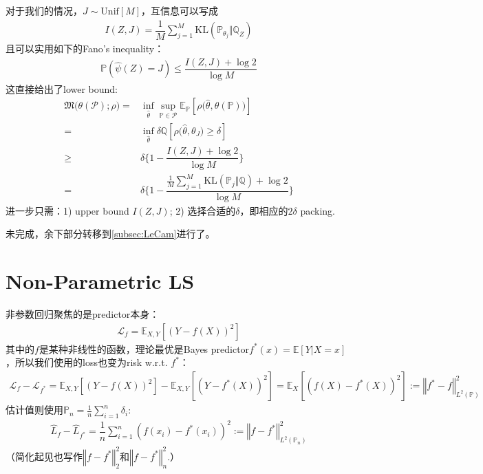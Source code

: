 \documentclass[11pt,a4paper]{ctexart}
\numberwithin{equation}{section}%
\begin{document}
对于我们的情况，$ J \sim \mathrm{ Unif }[M] $，互信息可以写成
\begin{align*}
    I(Z,J) = \dfrac{ 1 }{ M  } \sum_{j=1}^M \mathrm{ KL }\left( \mathbb{P}_{\theta _j}\Vert \mathbb{Q}_Z \right)
\end{align*}
且可以实用如下的Fano's inequality：
\begin{align*}
    \mathbb{P}\left( \hat{\psi}(Z) = J \right) \leq \dfrac{ I(Z,J)+ \log 2 }{ \log M }   
\end{align*}
这直接给出了lower bound:
\begin{align*}
    \mathfrak{M}\big(\theta (\mathcal{P});\rho \big)  = & \mathop{ \inf  }\limits_{\hat{\theta }} \mathop{ \sup  }\limits_{\mathbb{P}\in \mathcal{P}} \mathbb{E}_\mathbb{P}\left[ \rho \bigl(\hat{\theta }, \theta (\mathbb{P})\bigr) \right]   \\
    =& \mathop{ \inf  }\limits_{\hat{\theta }} \delta \mathbb{Q}[ \rho \bigl(\hat{\theta }, \theta_J \bigr) \geq \delta  ]\\
    \geq &\delta \big\{ 1-\dfrac{ I(Z,J)+ \log 2 }{ \log M }     \big\}\\
    =& \delta \big\{ 1-\dfrac{ \frac{1}{M} \sum_{j=1}^M \mathrm{ KL }(\mathbb{P}_j \Vert \mathbb{Q})  + \log 2 }{ \log M }     \big\}
\end{align*}
进一步只需：1) upper bound $ I(Z,J) $; 2) 选择合适的$ \delta  $，即相应的$ 2\delta  $ packing.


{\color{red}未完成}，余下部分转移到\ref{subsec:LeCam}进行了。





\section{Non-Parametric LS}
非参数回归聚焦的是predictor本身：
\begin{align*}
    \mathcal{L}_f= \mathbb{E}_{X,Y}\left[ (Y-f(X))^2 \right]  
\end{align*}
其中的$ f $是某种非线性的函数，理论最优是Bayes predictor$ f^*(x)=\mathbb{E}\left[ Y|X=x \right]  $，所以我们使用的loss也变为risk w.r.t. $ f^* $：
\begin{align*}
     \mathcal{L}_f-\mathcal{L}_{f^*} = \mathbb{E}_{X,Y}\left[ (Y-f(X))^2 \right] - \mathbb{E}_{X,Y}\left[ (Y-f^*(X))^2 \right] = \mathbb{E}_X\left[ (f(X)-f^*(X))^2 \right] := \left\Vert f^*-f \right\Vert^2_{L^2(\mathbb{P})} 
\end{align*}
估计值则使用$ \mathbb{P}_n = \frac{1}{n}\sum_{i=1}^n \delta _i $:
\begin{align*}
    \hat{L}_f-\hat{L}_{f^*}= \dfrac{ 1 }{ n }\sum_{i=1}^n \left(f(x_i)-f^*(x_i) \right)^2 := \left\Vert f-f^* \right\Vert ^2_{L^2(\mathbb{P}_n)}
\end{align*}
（简化起见也写作$ \left\Vert f-f^* \right\Vert^2_2  $和$ \left\Vert f-f^* \right\Vert^2_{n}  $.）
\end{document}
